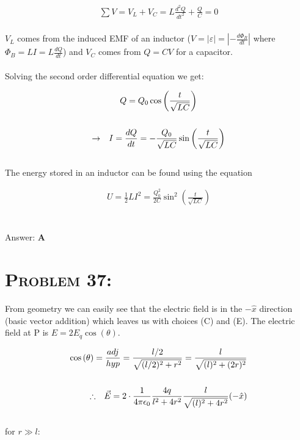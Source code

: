 \documentclass{article}
\begin{document}
\begin{align}
\sum V = V_{L} + V_{C} =  L \frac{d^{2} Q}{dt^{2}} + \frac{Q}{C} = 0
\end{align}
\\
$V_{L}$ comes from the induced EMF of an inductor ($V = |\varepsilon| = \left|-\frac{d \Phi_{B}}{dt}\right|$ where $\Phi_{B} = LI = L \frac{dQ}{dt}$) and $V_{C}$ comes from $Q = CV$ for a capacitor. \\
\\
Solving the second order differential equation we get:

\begin{gather}
Q = Q_{0} \cos{\left(\frac{t}{\sqrt{LC}}\right)}\nonumber\\
\nonumber\\
\rightarrow \hspace{.1in} I = \frac{dQ}{dt} = -\frac{Q_{0}}{\sqrt{LC}}\sin{\left(\frac{t}{\sqrt{LC}}\right)}\nonumber
\end{gather}
\\
The energy stored in an inductor can be found using the equation

\begin{align}
U = \frac{1}{2}LI^2 = \boxed{\frac{Q_{0}^{2}}{2C}\sin^2{\left(\frac{t}{\sqrt{LC}}\right)}}\nonumber
\end{align}
\\\\
Answer: \textbf{\textcolor{ProcessBlue}A}\\


\section{\textsc{Problem 37:}} From geometry we can easily see that the electric field is in the $-\hat{x}$ direction (basic vector addition) which leaves us with choices (C) and (E). The electric field at P is $E =2E_{q}\cos{(\theta)}$.

\begin{align}
\cos{(\theta)} = \frac{adj}{hyp} = \frac{l/2}{\sqrt{(l/2)^{2} +r^{2}}} = \frac{l}{\sqrt{(l)^{2} +(2r)^{2}}}\nonumber\\
\nonumber\\
\therefore \hspace{.1in}\vec{E} = 2 \cdot \frac{1}{4 \pi \epsilon_{0}} \frac{4q}{l^{2} +4r^{2}} \frac{l}{\sqrt{(l)^{2} +4r^{2}}}(-\hat{x})\nonumber
\end{align}
\\
for $r \gg l$:
\end{document}
